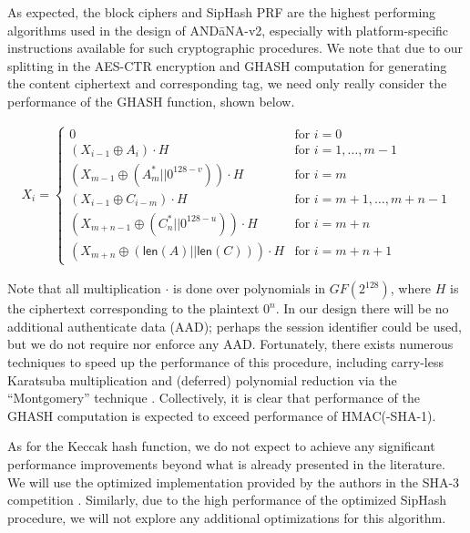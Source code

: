 \documentclass[10pt]{article}
\begin{document}
As expected, the block ciphers and SipHash PRF are the highest performing algorithms used in the design of {\sf AND\=aNA-v2}, especially with platform-specific instructions available for such cryptographic procedures. We note that due to our splitting in the AES-CTR encryption and GHASH computation for generating the content ciphertext and corresponding tag, we need only really consider the performance of the GHASH function, shown below.

\begin{align*}
X_i = 
\left\{
  \begin{array}{ll}
    0  & \mbox{for } i = 0 \\
    (X_{i-1} \oplus A_i) \cdot H  & \mbox{for } i = 1,\dots,m-1 \\
    (X_{m-1} \oplus (A_m^* || 0^{128 - v})) \cdot H  & \mbox{for } i = m \\
    (X_{i-1} \oplus C_{i-m}) \cdot H  & \mbox{for } i = m+1,\dots,m+n-1 \\
    (X_{m+n-1} \oplus (C_n^* || 0^{128 - u})) \cdot H  & \mbox{for } i = m+n \\
    (X_{m+n} \oplus (\mathsf{len}(A) || \mathsf{len}(C)))\cdot H  & \mbox{for } i = m+n+1 
  \end{array}
\right.
\end{align*}

Note that all multiplication $\cdot$ is done over polynomials in $GF(2^{128})$, where $H$ is the ciphertext corresponding to the plaintext $0^n$. In our design there will be no additional authenticate data (AAD); perhaps the session identifier could be used, but we do not require nor enforce any AAD. Fortunately, there exists numerous techniques to speed up the performance of this procedure, including carry-less Karatsuba multiplication and (deferred) polynomial reduction via the ``Montgomery'' technique \cite{aesgcm-intel}. Collectively, it is clear that performance of the GHASH computation is expected to exceed performance of HMAC(-SHA-1). 

As for the Keccak hash function, we do not expect to achieve any significant performance improvements beyond what is already presented in the literature. We will use the optimized implementation provided by the authors in the SHA-3 competition \cite{keccak-files}. Similarly, due to the high performance of the optimized SipHash procedure, we will not explore any additional optimizations for this algorithm.

\end{document}
